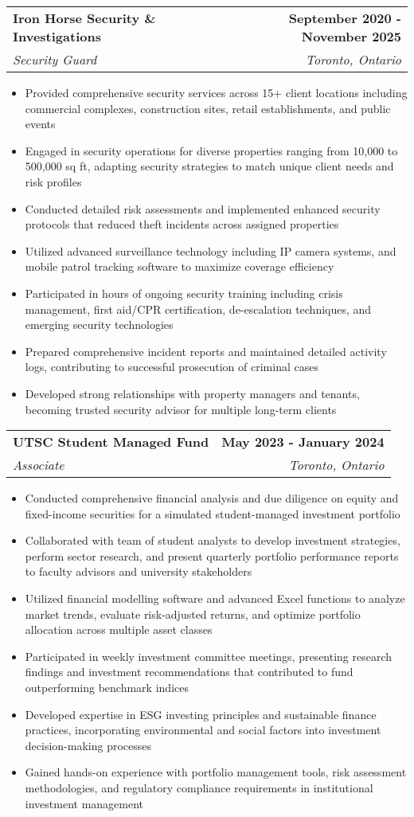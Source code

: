 \documentclass[letterpaper,11pt]{article}
\makeatletter
\newcommand{\resumeItem}[1]{
  \item\small{
    {#1 \vspace{-2pt}}
  }
}
\newcommand{\resumeSubheading}[4]{
  \vspace{-2pt}\item
    \begin{tabular*}{1.0\textwidth}[t]{l@{\extracolsep{\fill}}r}
      \textbf{#1} & \textbf{\small #2} \\
      \textit{\small#3} & \textit{\small #4} \\
    \end{tabular*}\vspace{-7pt}
}
\newcommand{\resumeItemListStart}{\begin{itemize}}
\newcommand{\resumeItemListEnd}{\end{itemize}\vspace{-5pt}}
\makeatother
\begin{document}
    \resumeSubheading
      {Iron Horse Security \& Investigations}{September 2020 - November 2025}
      {Security Guard}{Toronto, Ontario}
      \resumeItemListStart
        \resumeItem{Provided comprehensive security services across 15+ client locations including commercial complexes, construction sites, retail establishments, and public events}
        \resumeItem{Engaged in security operations for diverse properties ranging from 10,000 to 500,000 sq ft, adapting security strategies to match unique client needs and risk profiles}
        \resumeItem{Conducted detailed risk assessments and implemented enhanced security protocols that reduced theft incidents across assigned properties}
        \resumeItem{Utilized advanced surveillance technology including IP camera systems, and mobile patrol tracking software to maximize coverage efficiency}
        \resumeItem{Participated in hours of ongoing security training including crisis management, first aid/CPR certification, de-escalation techniques, and emerging security technologies}
        \resumeItem{Prepared comprehensive incident reports and maintained detailed activity logs, contributing to successful prosecution of criminal cases}
        \resumeItem{Developed strong relationships with property managers and tenants, becoming trusted security advisor for multiple long-term clients}
    \resumeItemListEnd

    \resumeSubheading
      {UTSC Student Managed Fund}{May 2023 - January 2024}
      {Associate}{Toronto, Ontario}
      \resumeItemListStart
        \resumeItem{Conducted comprehensive financial analysis and due diligence on equity and fixed-income securities for a simulated student-managed investment portfolio}
        \resumeItem{Collaborated with team of student analysts to develop investment strategies, perform sector research, and present quarterly portfolio performance reports to faculty advisors and university stakeholders}
        \resumeItem{Utilized financial modelling software and advanced Excel functions to analyze market trends, evaluate risk-adjusted returns, and optimize portfolio allocation across multiple asset classes}
        \resumeItem{Participated in weekly investment committee meetings, presenting research findings and investment recommendations that contributed to fund outperforming benchmark indices}
        \resumeItem{Developed expertise in ESG investing principles and sustainable finance practices, incorporating environmental and social factors into investment decision-making processes}
        \resumeItem{Gained hands-on experience with portfolio management tools, risk assessment methodologies, and regulatory compliance requirements in institutional investment management}
      \resumeItemListEnd
    
\end{document}
